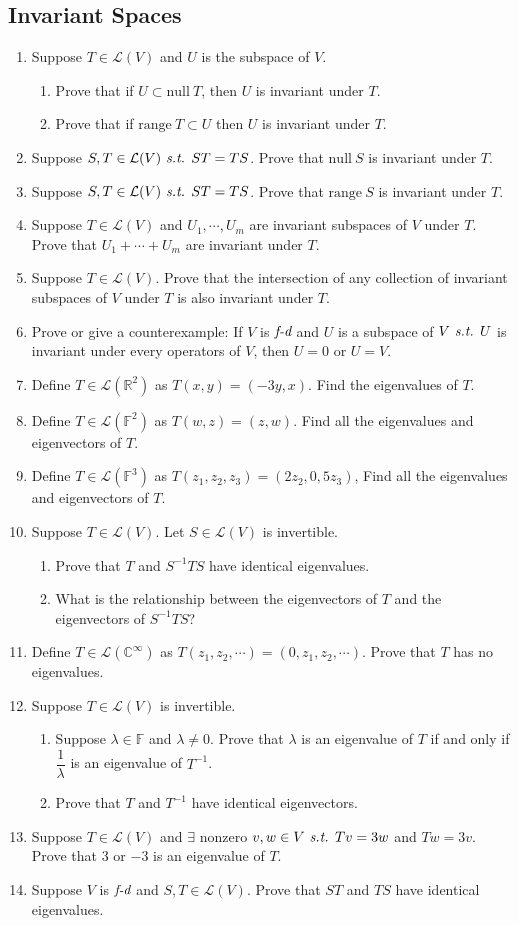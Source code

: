 \documentclass[11pt, letterpaper]{article}
\def\R{\mathbb{R}}
\def\C{\mathbb{C}}
\def\F{\mathbb{F}}
\def\L{\mathcal{L}}
\def\T{T^{-1}}
\def\st{\emph{ s.t. }}
\def\FD{\emph{f-d}}
\def\Null{\mathrm{null\ }}
\def\range{\mathrm{range\ }}
\begin{document}
\subsection{Invariant Spaces}
\begin{enumerate}
	\item Suppose $T\in\L(V)$ and $U$ is the subspace of $V$. \begin{enumerate}\item Prove that if $U\subset\Null T$, then $U$ is invariant under $T$. \item Prove that if $\range T\subset U$ then $U$ is invariant under $T$. \end{enumerate}
	\item Suppose $S,T\in\L(V)\st ST=TS$. Prove that $\Null S$ is invariant under $T$. 
	\item Suppose $S,T\in\L(V)\st ST=TS$. Prove that $\range S$ is invariant under $T$. 
	\item Suppose $T\in\L(V)$ and $U_1,\cdots,U_m$ are invariant subspaces of $V$ under $T$. Prove that $U_1+\cdots+U_m$ are invariant under $T$. 
	\item Suppose $T\in\L(V)$. Prove that the intersection of any collection of invariant subspaces of $V$ under $T$ is also invariant under $T$. 
	\item Prove or give a counterexample: If $V$ is $\FD$ and $U$ is a subspace of $V\st U$ is invariant under every operators of $V$, then $U=\qty{0}$ or $U=V$.
	\item Define $T\in\L(\R^2)$ as $T(x,y)=(-3y,x)$. Find the eigenvalues of $T$.
	\item Define $T\in\L(\F^2)$ as $T(w,z)=(z,w)$. Find all the eigenvalues and eigenvectors of $T$.
	\item Define $T\in\L(\F^3)$ as $T(z_1,z_2,z_3)=(2z_2,0,5z_3)$, Find all the eigenvalues and eigenvectors of $T$. 
	\item Suppose $T\in\L(V)$. Let $S\in\L(V)$ is invertible. \begin{enumerate}\item Prove that $T$ and $S^{-1}TS$ have identical eigenvalues. \item What is the relationship between the eigenvectors of $T$ and the eigenvectors of $S^{-1}TS$? \end{enumerate}
	\item Define $T\in\L(\C^\infty)$ as $T(z_1,z_2,\cdots)=(0,z_1,z_2,\cdots).$ Prove that $T$ has no eigenvalues.
	\item Suppose $T\in\L(V)$ is invertible. \begin{enumerate}\item Suppose $\lambda\in\F$ and $\lambda\neq0$. Prove that $\lambda$ is an eigenvalue of $T$ if and only if $\dfrac{1}{\lambda}$ is an eigenvalue of $\T$. \item Prove that $T$ and $\T$ have identical eigenvectors. \end{enumerate}
	\item Suppose $T\in\L(V)$ and $\exists$ nonzero $v,w\in V\st Tv=3w$ and $Tw=3v$. Prove that $3$ or $-3$ is an eigenvalue of $T$.
	\item Suppose $V$ is $\FD$ and $S,T\in\L(V)$. Prove that $ST$ and $TS$ have identical eigenvalues. 
\end{enumerate}
\end{document}
